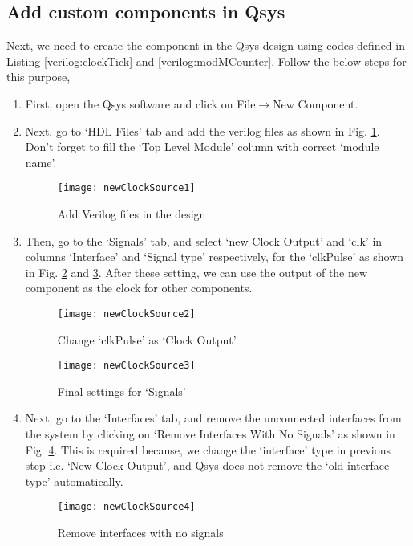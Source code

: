


\subsection{Add custom components in Qsys}
Next, we need to create the component in the Qsys design using codes defined in Listing \ref{verilog:clockTick} and \ref{verilog:modMCounter}. Follow the below steps for this purpose, 

\begin{enumerate}
	\item First, open the Qsys software and click on File$\rightarrow$New Component.
	\item Next, go to `HDL Files' tab and add the verilog files as shown in Fig. \ref{fig:newClockSource1}. Don't forget to fill the `Top Level Module' column with correct `module name'.
	\begin{figure}[!h]
		\centering
		\texttt{[image: newClockSource1]}
		\caption{Add Verilog files in the design}
		\label{fig:newClockSource1}
	\end{figure}
	
	\item Then, go to the `Signals' tab, and select `new Clock Output' and `clk' in columns `Interface' and `Signal type' respectively, for the `clkPulse' as shown in Fig. \ref{fig:newClockSource2} and \ref{fig:newClockSource3}. After these setting, we can use the output of the new component as the clock for other components.
	
	\begin{figure}[!h]
		\centering
		\texttt{[image: newClockSource2]}
		\caption{Change `clkPulse' as `Clock Output'}
		\label{fig:newClockSource2}
	\end{figure}
	\begin{figure}[!h]
		\centering
		\texttt{[image: newClockSource3]}
		\caption{Final settings for `Signals'}
		\label{fig:newClockSource3}
	\end{figure} 
	
	\item Next, go to the `Interfaces' tab, and remove the unconnected interfaces from the system by clicking on `Remove Interfaces With No Signals' as shown in Fig. \ref{fig:newClockSource4}. This is required because, we change the `interface' type in previous step i.e. `New Clock Output', and Qsys does not remove the `old interface type' automatically.
	\begin{figure}[!h]
		\centering
		\texttt{[image: newClockSource4]}
		\caption{Remove interfaces with no signals}
		\label{fig:newClockSource4}
	\end{figure} 
	

\end{enumerate}
